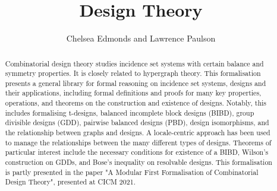 \documentclass[11pt,a4paper]{article}
\begin{document}
\title{Design Theory}
\author{Chelsea Edmonds and Lawrence Paulson}
\maketitle

\begin{abstract}
  Combinatorial design theory studies incidence set systems with certain balance and symmetry properties. It is closely related to hypergraph theory. This formalisation presents a general library for formal reasoning on incidence set systems, designs and their applications, including formal definitions and proofs for many key properties, operations, and theorems on the construction and existence of designs. Notably, this includes formalising t-designs, balanced incomplete block designs (BIBD), group divisible designs (GDD), pairwise balanced designs (PBD), design isomorphisms, and the relationship between graphs and designs. A locale-centric approach has been used to manage the relationships between the many different types of designs. Theorems of particular interest include the necessary conditions for existence of a BIBD, Wilson's construction on GDDs, and Bose's inequality on resolvable designs. This formalisation is partly presented in the paper "A Modular First Formalisation of Combinatorial Design Theory", presented at CICM 2021.
\end{abstract}

\tableofcontents





\end{document}
